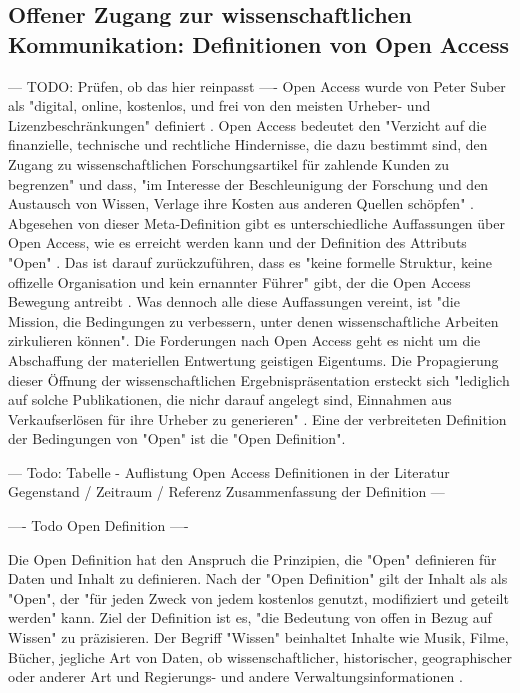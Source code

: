 \subsection{Offener Zugang zur wissenschaftlichen Kommunikation: Definitionen von Open Access}
--- TODO: Prüfen, ob das hier reinpasst ----
Open Access wurde von Peter Suber als "digital, online, kostenlos, und frei von den meisten Urheber- und Lizenzbeschränkungen" \cite{suber_2012_open} definiert \cite{Adema_2014_open_access}. Open Access bedeutet den "Verzicht auf die finanzielle, technische und rechtliche Hindernisse, die dazu bestimmt sind, den Zugang zu wissenschaftlichen Forschungsartikel für zahlende Kunden zu begrenzen" und dass, "im Interesse der Beschleunigung der Forschung und den Austausch von Wissen, Verlage ihre Kosten aus anderen Quellen schöpfen" \cite{Suber_2002}. Abgesehen von dieser Meta-Definition gibt es unterschiedliche Auffassungen über Open Access, wie es erreicht werden kann und der Definition des Attributs "Open" \cite{Adema_2014_open_access}. Das ist darauf zurückzuführen, dass es "keine formelle Struktur, keine offizelle Organisation und kein ernannter Führer" gibt, der die Open Access Bewegung antreibt \cite{poynder_2011_suber}. Was dennoch alle diese Auffassungen vereint, ist "die Mission, die Bedingungen zu verbessern, unter denen wissenschaftliche Arbeiten zirkulieren können"\cite{Adema_2014_open_access}. Die Forderungen nach Open Access geht es nicht um die Abschaffung der materiellen Entwertung geistigen Eigentums. Die Propagierung dieser Öffnung der wissenschaftlichen Ergebnispräsentation ersteckt sich "lediglich auf solche Publikationen, die nichr darauf angelegt sind, Einnahmen aus Verkaufserlösen für ihre Urheber zu generieren" \cite{muller_2010_open}. Eine der verbreiteten Definition der Bedingungen von "Open" ist die "Open Definition".

--- Todo: Tabelle - Auflistung Open Access Definitionen in der Literatur  
Gegenstand / Zeitraum / Referenz
Zusammenfassung der Definition --- 

---- Todo Open Definition ----

Die Open Definition hat den Anspruch die Prinzipien, die "Open" definieren für Daten und Inhalt zu definieren. Nach der "Open Definition" gilt der Inhalt als als "Open", der "für jeden Zweck von jedem kostenlos genutzt, modifiziert und geteilt werden" \cite{open_definition} kann. Ziel der Definition ist es, "die Bedeutung von offen in Bezug auf Wissen" zu präzisieren. Der Begriff "Wissen" beinhaltet Inhalte wie Musik, Filme, Bücher, jegliche Art von Daten, ob wissenschaftlicher, historischer, geographischer oder anderer Art und Regierungs- und andere Verwaltungsinformationen \cite{open_definition}.

